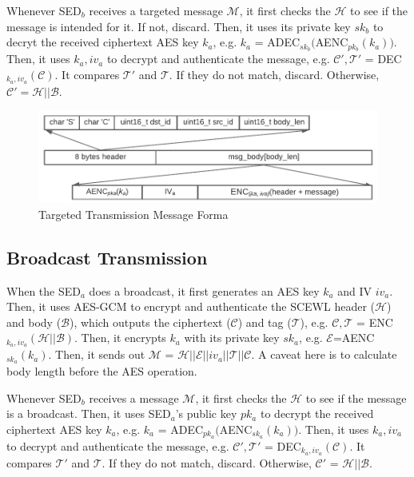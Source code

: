 \documentclass[11pt,oneside,onecolumn,letterpaper]{article}
\begin{document}
Whenever SED$_b$ receives a targeted message $\mathcal{M}$, it first checks the $\mathcal{H}$ to see if the message is intended for it. If not, discard.
Then, it uses its private key $sk_b$ to decryt the received ciphertext AES key $k_a$, e.g. $k_a$ = ADEC$_{sk_b}($AENC$_{pk_b}(k_a))$.
Then, it uses $k_a, iv_a$ to decrypt and authenticate the message, e.g. $\mathcal{C'}, \mathcal{T'}$ = DEC$_{k_a, iv_a}(\mathcal{C})$.
It compares $\mathcal{T'}$ and $\mathcal{T}$.
If they do not match, discard.
Otherwise, $\mathcal{C'}=\mathcal{H}||\mathcal{B}$.

\begin{figure}[!htbp]
  \begin{centering}
  \includegraphics[width = .80\textwidth]{pic/msg-format.pdf}
  \caption{Targeted Transmission Message Forma}
  \label{fig:msg}
  \end{centering}
\end{figure}

\subsection{Broadcast Transmission}

When the SED$_a$ does a broadcast, it first generates an AES key $k_a$ and IV $iv_a$. 
Then, it uses AES-GCM to encrypt and authenticate the SCEWL header ($\mathcal{H}$) and body ($\mathcal{B}$), which outputs the ciphertext ($\mathcal{C}$) and tag ($\mathcal{T}$), e.g. $\mathcal{C}, \mathcal{T}$ = ENC$_{k_a, iv_a}(\mathcal{H} || \mathcal{B})$.
Then, it encrypts $k_a$ with its private key $sk_a$, e.g. $\mathcal{E}$=AENC$_{sk_a}(k_a)$.
Then, it sends out $\mathcal{M}$ = $\mathcal{H} || \mathcal{E}||iv_a||\mathcal{T}||\mathcal{C}$.
A caveat here is to calculate body length before the AES operation.

Whenever SED$_b$ receives a message $\mathcal{M}$, it first checks the $\mathcal{H}$ to see if the message is a broadcast.
Then, it uses SED$_a$'s public key $pk_a$ to decrypt the received ciphertext AES key $k_a$, e.g. $k_a$ = ADEC$_{pk_a}($AENC$_{sk_a}(k_a))$.
Then, it uses $k_a, iv_a$ to decrypt and authenticate the message, e.g. $\mathcal{C'}, \mathcal{T'}$ = DEC$_{k_a, iv_a}(\mathcal{C})$.
It compares $\mathcal{T'}$ and $\mathcal{T}$.
If they do not match, discard.
Otherwise, $\mathcal{C'}$ = $\mathcal{H}||\mathcal{B}$.
\end{document}
